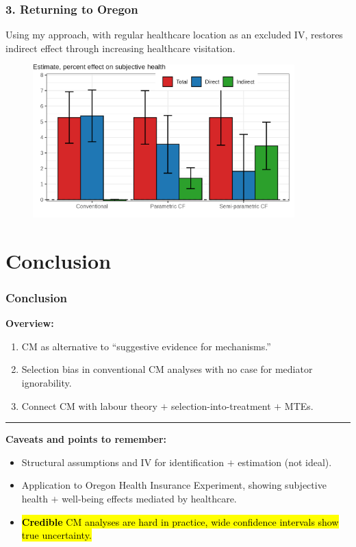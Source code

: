 \documentclass[dvipsnames]{beamer} %
\makeatletter
\let\HL\hl
\renewcommand\hl{%
    \let\set@color\beamerorig@set@color
    \let\reset@color\beamerorig@reset@color
    \HL}
\makeatother
\begin{document}
\begin{frame}
    \frametitle{3. Returning to Oregon}
    Using my approach, with regular healthcare location as an excluded IV, restores indirect effect through increasing healthcare visitation.
    \vskip0.5cm
    
    \begin{figure}
        \centering
        \includegraphics[width=0.9\textwidth]{
            ../text/sections/figures/mediation-health.png}
    \end{figure}
\end{frame}
\section{Conclusion}
\begin{frame}
    \frametitle{Conclusion}
    \textbf{Overview:}
    \begin{enumerate}
        \item CM as alternative to ``suggestive evidence for mechanisms.''
        \item Selection bias in conventional CM analyses with no case for mediator ignorability.
        \item Connect CM with labour theory $+$ selection-into-treatment $+$ MTEs.
    \end{enumerate}
    \par\noindent\rule{\textwidth}{0.4pt}
    \small
    \textbf{Caveats and points to remember:}
    \begin{itemize}
        \item Structural assumptions and IV for identification $+$ estimation (not ideal).
        \item Application to Oregon Health Insurance Experiment, showing subjective health $+$ well-being effects mediated by healthcare.
        \item \hl{\textbf{Credible} CM analyses are hard in practice, wide confidence intervals show true uncertainty.}
    \end{itemize}
\end{frame}
\end{document}
